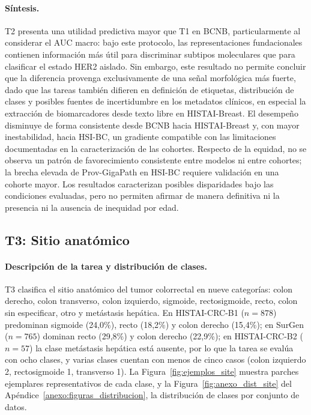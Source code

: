 \paragraph{Síntesis.} T2 presenta una utilidad predictiva mayor que T1 en BCNB, particularmente al considerar el AUC macro: bajo este protocolo, las representaciones fundacionales contienen información más útil para discriminar subtipos moleculares que para clasificar el estado HER2 aislado. Sin embargo, este resultado no permite concluir que la diferencia provenga exclusivamente de una señal morfológica más fuerte, dado que las tareas también difieren en definición de etiquetas, distribución de clases y posibles fuentes de incertidumbre en los metadatos clínicos, en especial la extracción de biomarcadores desde texto libre en HISTAI-Breast. El desempeño disminuye de forma consistente desde BCNB hacia HISTAI-Breast y, con mayor inestabilidad, hacia HSI-BC, un gradiente compatible con las limitaciones documentadas en la caracterización de las cohortes. Respecto de la equidad, no se observa un patrón de favorecimiento consistente entre modelos ni entre cohortes; la brecha elevada de Prov-GigaPath en HSI-BC requiere validación en una cohorte mayor. Los resultados caracterizan posibles disparidades bajo las condiciones evaluadas, pero no permiten afirmar de manera definitiva ni la presencia ni la ausencia de inequidad por edad.

\subsection{T3: Sitio anatómico}
\label{sec:resultado_site}

\paragraph{Descripción de la tarea y distribución de clases.} T3 clasifica el sitio anatómico del tumor colorrectal en nueve categorías: colon derecho, colon transverso, colon izquierdo, sigmoide, rectosigmoide, recto, colon sin especificar, otro y metástasis hepática. En HISTAI-CRC-B1 ($n=878$) predominan sigmoide (24,0\%), recto (18,2\%) y colon derecho (15,4\%); en SurGen ($n=765$) dominan recto (29,8\%) y colon derecho (22,9\%); en HISTAI-CRC-B2 ($n=57$) la clase metástasis hepática está ausente, por lo que la tarea se evalúa con ocho clases, y varias clases cuentan con menos de cinco casos (colon izquierdo 2, rectosigmoide 1, transverso 1). La Figura~\ref{fig:ejemplos_site} muestra parches ejemplares representativos de cada clase, y la Figura~\ref{fig:anexo_dist_site} del Apéndice~\ref{anexo:figuras_distribucion}, la distribución de clases por conjunto de datos.


